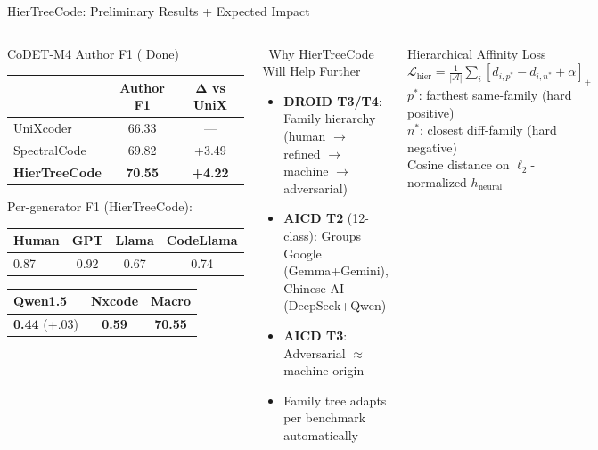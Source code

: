 \documentclass[aspectratio=169, 10pt]{beamer}
\begin{document}
\begin{frame}{HierTreeCode: Preliminary Results + Expected Impact}
\vspace{-0.15cm}
\begin{columns}[T]
\begin{block}{CoDET-M4 Author F1 ( Done)}
\centering\footnotesize
\begin{tabular}{lcc}
\toprule
& \textbf{Author F1} & $\boldsymbol{\Delta}$ vs UniX \\
\midrule
UniXcoder & 66.33 & --- \\
SpectralCode & 69.82 & +3.49 \\
\rowcolor{oursgreen}
\textbf{HierTreeCode} & \textbf{70.55} & \textbf{+4.22} \\
\bottomrule
\end{tabular}

\vspace{0.1cm}
{\scriptsize Per-generator F1 (HierTreeCode):}
\scriptsize
\begin{tabular}{lccc}
\toprule
Human & GPT & Llama & CodeLlama \\
\midrule
0.87 & 0.92 & 0.67 & 0.74 \\
\bottomrule
\end{tabular}
\begin{tabular}{lcc}
\toprule
\alert{Qwen1.5} & \alert{Nxcode} & Macro \\
\midrule
\textbf{0.44} {\tiny(+.03)} & \textbf{0.59} & \textbf{70.55} \\
\bottomrule
\end{tabular}
\end{block}

\begin{alertblock}{\faStar\ Why HierTreeCode Will Help Further}
\small
\begin{itemize}\setlength\itemsep{3pt}
    \item \textbf{DROID T3/T4}: Family hierarchy (human $\to$ refined $\to$ machine $\to$ adversarial)
    \item \textbf{AICD T2} (12-class): Groups Google (Gemma+Gemini), Chinese AI (DeepSeek+Qwen)
    \item \textbf{AICD T3}: Adversarial $\approx$ machine origin
    \item Family tree adapts per benchmark automatically
\end{itemize}
\end{alertblock}

\begin{exampleblock}{\scriptsize Hierarchical Affinity Loss}
\scriptsize
$\mathcal{L}_{\text{hier}} = \frac{1}{|\mathcal{A}|}\sum_{i}[d_{i,p^*} - d_{i,n^*} + \alpha]_+$\\[2pt]
$p^*$: farthest same-family (hard positive)\\
$n^*$: closest diff-family (hard negative)\\
Cosine distance on $\ell_2$-normalized $h_{\text{neural}}$
\end{exampleblock}
\end{columns}
\end{frame}
\end{document}
